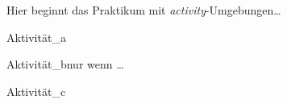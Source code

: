 \documentclass{var}
\begin{document}
\activitiessection
Hier beginnt das Praktikum mit \textit{activity}-Umgebungen\dots

\lipsum[17]

\begin{activity}{Aktivität\_a}{}
    \lipsum[18-19]
\end{activity}

\begin{activity}{Aktivität\_b}{nur wenn \dots}
    \lipsum[20]
\end{activity}

\lipsum[20]

\begin{activity}{Aktivität\_c}{}
    \lipsum[22]
\end{activity}
\end{document}
